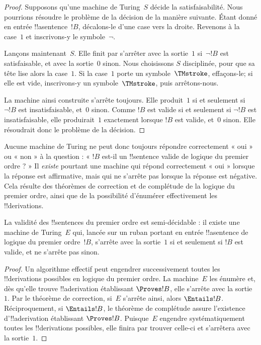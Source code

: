 \documentclass[../../../include/open-logic-section]{subfiles}
\begin{document}
\begin{proof}
Supposons qu'une machine de Turing~$S$ décide la satisfaisabilité.
Nous pourrions résoudre le problème de la décision de la manière
suivante. Étant donné en entrée !!a{sentence}~$!B$, décalons-le
d'une case vers la droite. Revenons à la case~$1$ et inscrivons-y
le symbole~$\lnot$.

Lançons maintenant~$S$. Elle finit par s'arrêter avec la sortie~$1$
si~$\lnot !B$ est satisfaisable, et avec la sortie~$0$ sinon. Nous choisissons $S$ disciplinée, pour que sa tête lise alors la case~$1$.
Si la case~$1$ porte un symbole~$\TMstroke$, effaçons-le; si elle
est vide, inscrivons-y un symbole~$\TMstroke$, puis arrêtons-nous.

La machine ainsi construite s'arrête toujours. Elle produit~$1$
si et seulement si $\lnot !B$ est insatisfaisable, et~$0$ sinon.
Comme $!B$ est valide si et seulement si $\lnot !B$ est
insatisfaisable, elle produirait~$1$ exactement lorsque $!B$ est
valide, et~$0$ sinon. Elle résoudrait donc le problème de la décision.
\end{proof}

\begin{explain}
Aucune machine de Turing ne peut donc toujours répondre correctement
« oui » ou « non » à la question : « $!B$ est-il un !!{sentence}
valide de logique du premier ordre ? » Il \emph{existe} pourtant une machine
qui répond correctement « oui » lorsque la réponse est affirmative,
mais qui ne s'arrête pas lorsque la réponse est négative. Cela
résulte des théorèmes de correction et de complétude de la logique
du premier ordre, ainsi que de la possibilité d'énumérer
effectivement les !!{derivation}s.
\end{explain}

\begin{thm}
%
La validité des !!{sentence}s du premier ordre est semi-décidable :
il existe une machine de Turing~$E$ qui, lancée sur un ruban portant
en entrée !!a{sentence} de logique du premier ordre~$!B$, s'arrête
avec la sortie~$1$ si et seulement si $!B$ est valide, et ne
s'arrête pas sinon.
\end{thm}

\begin{proof}
Un algorithme effectif peut engendrer successivement toutes les
!!{derivation}s possibles en logique du premier ordre. La
machine~$E$ les énumère et, dès qu'elle trouve !!a{derivation}
établissant $\Proves !B$, elle s'arrête avec la sortie~$1$.
Par le théorème de correction, si~$E$ s'arrête ainsi, alors
$\Entails !B$. Réciproquement, si $\Entails !B$, le théorème de
complétude assure l'existence d'!!a{derivation} établissant
$\Proves !B$. Puisque~$E$ engendre systématiquement toutes les
!!{derivation}s possibles, elle finira par trouver celle-ci et
s'arrêtera avec la sortie~$1$.
\end{proof}
\end{document}
